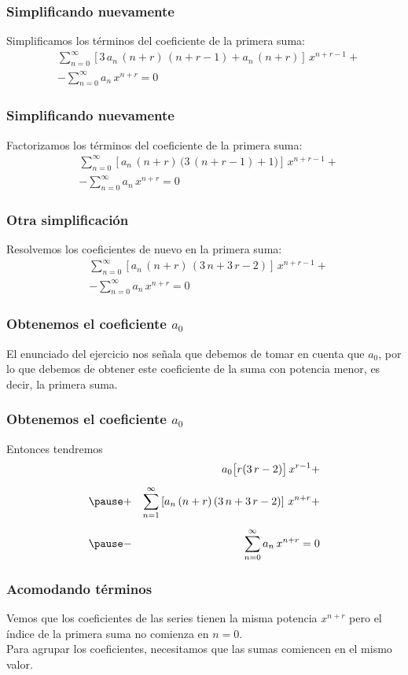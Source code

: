 \begin{frame}
\frametitle{Simplificando nuevamente}
Simplificamos los términos del coeficiente de la primera suma:
\begin{align*}
&\sum_{n=0}^{\infty} \left[  3 \, a_{n} \, (n + r) \, (n+ r - 1) + a_{n} \, (n + r) \right] \, x^{n+r-1} + \\[0.5em]
&- \sum_{n=0}^{\infty} a_{n} \, x^{n+r} = 0
\end{align*}
\end{frame}
\begin{frame}
\frametitle{Simplificando nuevamente}
Factorizamos los términos del coeficiente de la primera suma:
\begin{align*}
&\sum_{n=0}^{\infty} \left[  a_{n} \, (n + r) \, \big( 3 \, (n + r - 1) + 1 \big) \right] \, x^{n+r-1} + \\[0.5em]
&- \sum_{n=0}^{\infty} a_{n} \, x^{n+r} = 0
\end{align*}
\end{frame}
\begin{frame}
\frametitle{Otra simplificación}
Resolvemos los coeficientes de nuevo en la primera suma:
\begin{align*}
&\sum_{n=0}^{\infty} \left[  a_{n} \, (n + r) \, (3 \, n + 3 \, r - 2) \right] \, x^{n+r-1} + \\[0.5em]
&- \sum_{n=0}^{\infty} a_{n} \, x^{n+r} = 0
\end{align*}
\end{frame}
\begin{frame}
\frametitle{Obtenemos el coeficiente $a_{0}$}
El enunciado del ejercicio nos señala que debemos de tomar en cuenta que $a_{0}$, por lo que debemos de obtener este coeficiente de la suma con potencia menor, es decir, la primera suma.
\end{frame}
\begin{frame}
\frametitle{Obtenemos el coeficiente $a_{0}$}
Entonces tendremos
\begin{eqnarray*}
&{}& a_{0} \big[ r (3 \, r - 2) \big] \, x^{r-1} + \\[0.5em] \pause
&+& \sum_{n=1}^{\infty} \left[  a_{n} \, (n + r) \, (3 \, n + 3 \, r - 2) \right] \, x^{n+r} + \\[0.5em] \pause
&-& \sum_{n=0}^{\infty} a_{n} \, x^{n+r} = 0
\end{eqnarray*}
\end{frame}
\begin{frame}
\frametitle{Acomodando términos}
Vemos que los coeficientes de las series tienen la misma potencia $x^{n+r}$ pero el índice de la primera suma no comienza en $n=0$.
\\
\bigskip
\pause
Para agrupar los coeficientes, necesitamos que las sumas comiencen en el mismo valor.
\end{frame}
